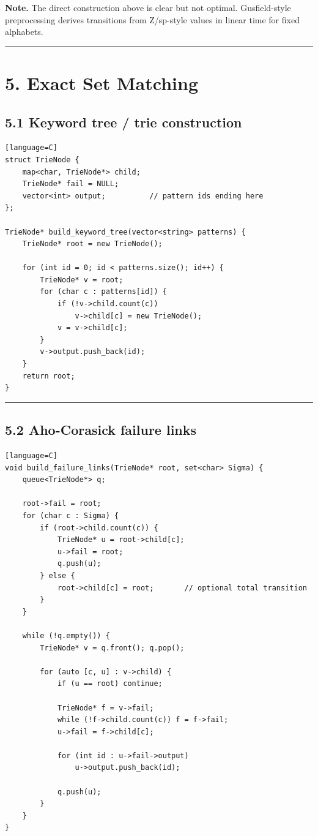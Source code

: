 \documentclass[11pt]{article}
\begin{document}
\textbf{Note.} The direct construction above is clear but not optimal. Gusfield-style preprocessing derives transitions from Z/sp-style values in linear time for fixed alphabets.

\begin{center}\rule{0.5\linewidth}{0.5pt}\end{center}

\section{5. Exact Set Matching}\label{exact-set-matching}

\subsection{5.1 Keyword tree / trie construction}\label{keyword-tree-trie-construction}

\begin{verbatim}[language=C]
struct TrieNode {
    map<char, TrieNode*> child;
    TrieNode* fail = NULL;
    vector<int> output;          // pattern ids ending here
};

TrieNode* build_keyword_tree(vector<string> patterns) {
    TrieNode* root = new TrieNode();

    for (int id = 0; id < patterns.size(); id++) {
        TrieNode* v = root;
        for (char c : patterns[id]) {
            if (!v->child.count(c))
                v->child[c] = new TrieNode();
            v = v->child[c];
        }
        v->output.push_back(id);
    }
    return root;
}
\end{verbatim}

\begin{center}\rule{0.5\linewidth}{0.5pt}\end{center}

\subsection{5.2 Aho-Corasick failure links}\label{aho-corasick-failure-links}

\begin{verbatim}[language=C]
void build_failure_links(TrieNode* root, set<char> Sigma) {
    queue<TrieNode*> q;

    root->fail = root;
    for (char c : Sigma) {
        if (root->child.count(c)) {
            TrieNode* u = root->child[c];
            u->fail = root;
            q.push(u);
        } else {
            root->child[c] = root;       // optional total transition
        }
    }

    while (!q.empty()) {
        TrieNode* v = q.front(); q.pop();

        for (auto [c, u] : v->child) {
            if (u == root) continue;

            TrieNode* f = v->fail;
            while (!f->child.count(c)) f = f->fail;
            u->fail = f->child[c];

            for (int id : u->fail->output)
                u->output.push_back(id);

            q.push(u);
        }
    }
}
\end{verbatim}
\end{document}
